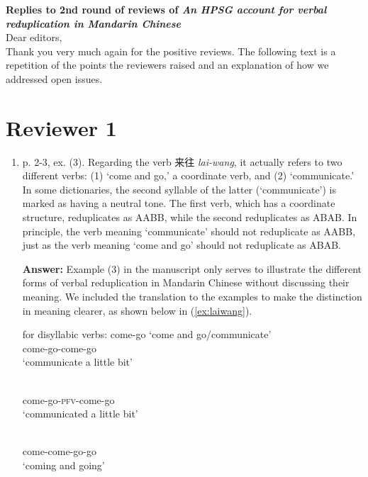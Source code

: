\documentclass[fleqn,twoside]{article}
\begin{document}
\noindent
{\large\bf Replies to 2nd round of reviews of \emph{An HPSG account for verbal reduplication in Mandarin Chinese}}\\

\noindent
Dear editors,\\

\noindent
Thank you very much again for the positive reviews. The following text is a repetition of the points the
reviewers raised and an explanation of how we addressed open issues.

\section{Reviewer 1}\label{sec:1}

\begin{enumerate}
\item p. 2-3, ex. (3). Regarding the verb 来往 \textit{lai-wang}, it actually refers to two different verbs: (1) `come
and go,' a coordinate verb, and (2) `communicate.' In some dictionaries, the second syllable of the
latter (`communicate') is marked as having a neutral tone. The first verb, which has a coordinate
structure, reduplicates as AABB, while the second reduplicates as ABAB. In principle, the verb
meaning `communicate' should not reduplicate as AABB, just as the verb meaning `come and go'
should not reduplicate as ABAB.

\noindent
\textbf{Answer:} Example (3)  in the manuscript only serves to
 illustrate the different forms of verbal reduplication in Mandarin Chinese
  without discussing their meaning. 
  We included the translation to the examples 
  to make the distinction in meaning clearer, 
  as shown below in (\ref{ex:laiwang}).

\ea\label{ex:laiwang} for disyllabic verbs:  come-go `come and go/communicate'
\ea \gll {}\\
come-go-come-go\\ 
\glt `communicate a little bit'

\ex \gll {}\\
come-go-\textsc{pfv}-come-go\\ 
\glt `communicated a little bit'

\ex \gll {}\\
come-come-go-go\\ 
\glt `coming and going'


\end{enumerate}
\end{document}
